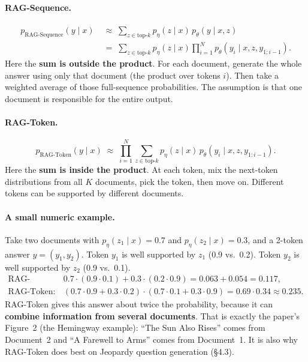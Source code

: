 \documentclass[11pt]{article}
\newcommand{\topk}{\text{top-}k}
\begin{document}
\paragraph{RAG-Sequence.}
\begin{equation}
\begin{split}
  p_{\text{RAG-Sequence}}(y \mid x) &\;\approx\; \sum_{z \in \topk} p_\eta(z \mid x)\, p_\theta(y \mid x, z) \\
  &\;=\; \sum_{z \in \topk} p_\eta(z \mid x) \prod_{i=1}^{N} p_\theta(y_i \mid x, z, y_{1:i-1}).
\end{split}
\end{equation}
Here the \textbf{sum is outside the product}. For each document, generate the whole answer using only that document (the product over tokens $i$). Then take a weighted average of those full-sequence probabilities. The assumption is that one document is responsible for the entire output.

\paragraph{RAG-Token.}
\begin{equation}
  p_{\text{RAG-Token}}(y \mid x) \;\approx\; \prod_{i=1}^{N} \sum_{z \in \topk} p_\eta(z \mid x)\, p_\theta(y_i \mid x, z, y_{1:i-1}).
\end{equation}
Here the \textbf{sum is inside the product}. At each token, mix the next-token distributions from all $K$ documents, pick the token, then move on. Different tokens can be supported by different documents.

\paragraph{A small numeric example.}
Take two documents with $p_\eta(z_1 \mid x) = 0.7$ and $p_\eta(z_2 \mid x) = 0.3$, and a 2-token answer $y = (y_1, y_2)$. Token $y_1$ is well supported by $z_1$ (0.9 vs.\ 0.2). Token $y_2$ is well supported by $z_2$ (0.9 vs.\ 0.1).
\begin{align}
  \text{RAG-Sequence:}\quad & 0.7 \cdot (0.9 \cdot 0.1) + 0.3 \cdot (0.2 \cdot 0.9) = 0.063 + 0.054 = 0.117, \\
  \text{RAG-Token:}\quad & (0.7 \cdot 0.9 + 0.3 \cdot 0.2) \cdot (0.7 \cdot 0.1 + 0.3 \cdot 0.9) = 0.69 \cdot 0.34 \approx 0.235.
\end{align}
RAG-Token gives this answer about twice the probability, because it can \textbf{combine information from several documents}. That is exactly the paper's Figure~2 (the Hemingway example): ``The Sun Also Rises'' comes from Document~2 and ``A Farewell to Arms'' comes from Document~1. It is also why RAG-Token does best on Jeopardy question generation (\S4.3).
\end{document}
